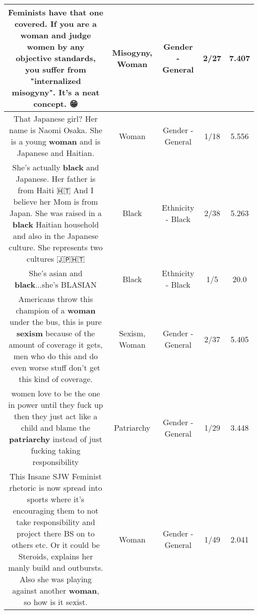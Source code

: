 \documentclass[11pt]{article}
\newlength\mylength
\begin{document}
\begin{center}
\begin{longtable}{|C{.65\mylength}|C{.30\mylength}|C{.12\mylength}|C{.12\mylength}|C{.12\mylength}|}
  \small Feminists have that one covered. If you are a \textbf{woman} and judge women by any objective standards, you suffer from "internalized \textbf{misogyny}". It's a neat concept. 😁\normalsize   & Misogyny, Woman & Gender - General & 2/27 & 7.407 \\  \hline
  \small That Japanese girl? Her name is Naomi Osaka. She is a young \textbf{woman} and is Japanese and Haitian.\normalsize   & Woman & Gender - General & 1/18 & 5.556 \\  \hline
  \small She's actually \textbf{black} and Japanese. Her father is from Haiti 🇭🇹 And I believe her Mom is from Japan. She was raised in a \textbf{black} Haitian household and also in the Japanese culture. She represents two cultures 🇯🇵🇭🇹\normalsize   & Black & Ethnicity - Black & 2/38 & 5.263 \\  \hline
  \small She's asian and \textbf{black}...she's BLASIAN\normalsize   & Black & Ethnicity - Black & 1/5 & 20.0 \\  \hline
  \small Americans throw this champion of a \textbf{woman} under the bus, this is pure \textbf{sexism} because of the amount of coverage it gets, men who do this and do even worse stuff don't get this kind of coverage.\normalsize   & Sexism, Woman & Gender - General & 2/37 & 5.405 \\  \hline
  \small women love to be the one in power until they fuck up then they just act like a child and blame the \textbf{patriarchy} instead of just fucking taking responsibility\normalsize   & Patriarchy & Gender - General & 1/29 & 3.448 \\  \hline
  \small This Insane SJW Feminist rhetoric is now spread into sports where it's encouraging them to not take responsibility and project there BS on to others etc. Or it could be Steroids, explains her manly build and outbursts. Also she was playing against another \textbf{woman}, so how is it sexist.\normalsize   & Woman & Gender - General & 1/49 & 2.041 \\  \hline

\end{longtable}
\end{center}
\end{document}
